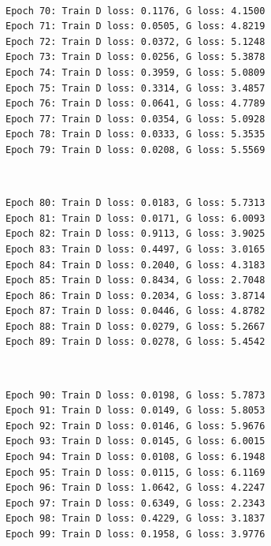 \documentclass[11pt]{article}
\begin{document}
    \begin{center}
    \end{center}
    { \hspace*{\fill} \\}
    
    \begin{Verbatim}[commandchars=\\\{\}]
Epoch 70: Train D loss: 0.1176, G loss: 4.1500
Epoch 71: Train D loss: 0.0505, G loss: 4.8219
Epoch 72: Train D loss: 0.0372, G loss: 5.1248
Epoch 73: Train D loss: 0.0256, G loss: 5.3878
Epoch 74: Train D loss: 0.3959, G loss: 5.0809
Epoch 75: Train D loss: 0.3314, G loss: 3.4857
Epoch 76: Train D loss: 0.0641, G loss: 4.7789
Epoch 77: Train D loss: 0.0354, G loss: 5.0928
Epoch 78: Train D loss: 0.0333, G loss: 5.3535
Epoch 79: Train D loss: 0.0208, G loss: 5.5569

    \end{Verbatim}

    \begin{center}
    \end{center}
    { \hspace*{\fill} \\}
    
    \begin{Verbatim}[commandchars=\\\{\}]
Epoch 80: Train D loss: 0.0183, G loss: 5.7313
Epoch 81: Train D loss: 0.0171, G loss: 6.0093
Epoch 82: Train D loss: 0.9113, G loss: 3.9025
Epoch 83: Train D loss: 0.4497, G loss: 3.0165
Epoch 84: Train D loss: 0.2040, G loss: 4.3183
Epoch 85: Train D loss: 0.8434, G loss: 2.7048
Epoch 86: Train D loss: 0.2034, G loss: 3.8714
Epoch 87: Train D loss: 0.0446, G loss: 4.8782
Epoch 88: Train D loss: 0.0279, G loss: 5.2667
Epoch 89: Train D loss: 0.0278, G loss: 5.4542

    \end{Verbatim}

    \begin{center}
    \end{center}
    { \hspace*{\fill} \\}
    
    \begin{Verbatim}[commandchars=\\\{\}]
Epoch 90: Train D loss: 0.0198, G loss: 5.7873
Epoch 91: Train D loss: 0.0149, G loss: 5.8053
Epoch 92: Train D loss: 0.0146, G loss: 5.9676
Epoch 93: Train D loss: 0.0145, G loss: 6.0015
Epoch 94: Train D loss: 0.0108, G loss: 6.1948
Epoch 95: Train D loss: 0.0115, G loss: 6.1169
Epoch 96: Train D loss: 1.0642, G loss: 4.2247
Epoch 97: Train D loss: 0.6349, G loss: 2.2343
Epoch 98: Train D loss: 0.4229, G loss: 3.1837
Epoch 99: Train D loss: 0.1958, G loss: 3.9776

    \end{Verbatim}
\end{document}
